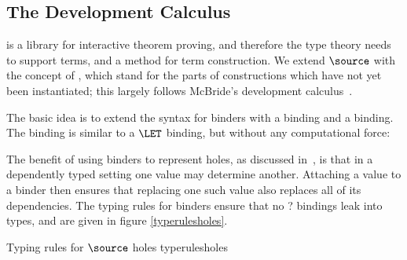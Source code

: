 \subsection{The Development Calculus}

\Ivor{} is a library for interactive theorem proving, and therefore
the type theory needs to support  terms, and a
method for term construction. We extend $\source$ with the concept of
, which stand for the parts of constructions which have
not yet been instantiated; this largely follows McBride's \Oleg{}
development calculus~\cite{mcbride-thesis}.

The basic idea is to extend the syntax for binders with a 
binding and a  binding. The  binding is
similar to a $\LET$ binding, but without any computational force:


The benefit of using binders to represent holes, as discussed
in~\cite{mcbride-thesis}, is that in a dependently typed setting one
value may determine another. Attaching a value to a binder then
ensures that replacing one such value also replaces all of its
dependencies. The typing rules for binders ensure that no ? bindings
leak into types, and are given in figure \ref{typerulesholes}.

{Typing rules for $\source$ holes}
{typerulesholes}




